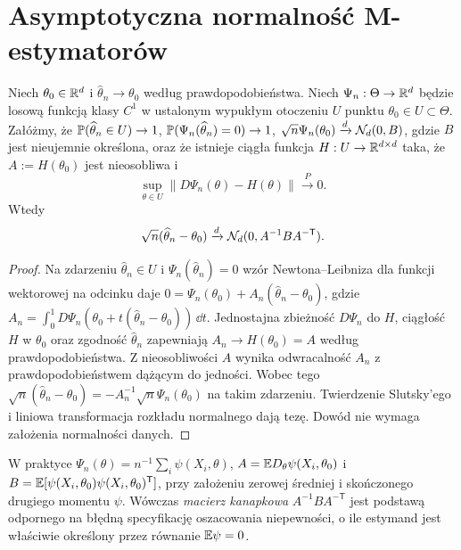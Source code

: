 \section{Asymptotyczna normalność M-estymatorów}
\begin{twierdzenie}
\label{thm:m-est-normality}
Niech $\theta_0\in\mathbb R^d$ i $\widehat\theta_n\to\theta_0$
według prawdopodobieństwa. Niech $\Psi_n:\Theta\to\mathbb R^d$
będzie losową funkcją klasy $C^1$ w ustalonym wypukłym otoczeniu
$U$ punktu $\theta_0\in U\subset\Theta$. Załóżmy, że
$\mathbb P(\widehat\theta_n\in U)\to1$,
$\mathbb P(\Psi_n(\widehat\theta_n)=0)\to1$,
$\sqrt n\Psi_n(\theta_0)\xrightarrow{d}\mathcal N_d(0,B)$,
gdzie $B$ jest nieujemnie określona, oraz że istnieje
ciągła funkcja $H:U\to\mathbb R^{d\times d}$ taka, że
$A:=H(\theta_0)$ jest nieosobliwa i
\[
\sup_{\theta\in U}\|D\Psi_n(\theta)-H(\theta)\|
\xrightarrow{P}0.
\]
Wtedy
\[
\sqrt n(\widehat\theta_n-\theta_0)
\xrightarrow{d}\mathcal N_d(0,A^{-1}B A^{-\mathsf T}).
\]
\end{twierdzenie}
\begin{proof}
Na zdarzeniu $\widehat\theta_n\in U$ i
$\Psi_n(\widehat\theta_n)=0$ wzór Newtona--Leibniza dla
funkcji wektorowej na odcinku daje
$0=\Psi_n(\theta_0)+A_n(\widehat\theta_n-\theta_0)$,
gdzie $A_n=\int_0^1D\Psi_n(\theta_0+t(\widehat\theta_n-
\theta_0))\,\dd t$.
Jednostajna zbieżność $D\Psi_n$ do $H$, ciągłość $H$ w
$\theta_0$ oraz zgodność $\widehat\theta_n$ zapewniają
$A_n\to H(\theta_0)=A$ według prawdopodobieństwa.
Z nieosobliwości $A$ wynika odwracalność
$A_n$ z prawdopodobieństwem dążącym do jedności.
Wobec tego $\sqrt n(\widehat\theta_n-\theta_0)
=-A_n^{-1}\sqrt n\Psi_n(\theta_0)$ na takim zdarzeniu.
Twierdzenie Slutsky'ego i liniowa transformacja rozkładu normalnego
dają tezę. Dowód nie wymaga założenia normalności danych.
\end{proof}

W praktyce $\Psi_n(\theta)=n^{-1}\sum_i\psi(X_i,\theta)$,
$A=\mathbb E D_\theta\psi(X_i,\theta_0)$ i
$B=\mathbb E[\psi(X_i,\theta_0)\psi(X_i,\theta_0)^{\mathsf T}]$,
przy założeniu zerowej średniej i skończonego drugiego momentu
$\psi$. Wówczas \emph{macierz kanapkowa}
$A^{-1}BA^{-\mathsf T}$ jest podstawą odpornego na błędną
specyfikację oszacowania niepewności, o ile estymand jest
właściwie określony przez równanie $\mathbb E\psi=0$.

